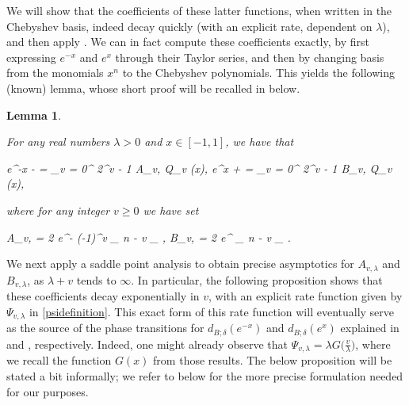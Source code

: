 \documentclass[10pt,a4paper]{article}
\theoremstyle{plain}\newtheorem{theorem}{Theorem}
\newtheorem{lemma}[theorem]{Lemma}
\theoremstyle{definition}
\begin{document}
	We will show that the coefficients of these latter functions, when written in the Chebyshev basis, indeed decay quickly (with an explicit rate, dependent on $\lambda$), and then apply . We can in fact compute these coefficients exactly, by first expressing $e^{-x}$ and $e^x$ through their Taylor series, and then by changing basis from the monomials $x^n$ to the Chebyshev polynomials. This yields the following (known) lemma, whose short proof will be recalled in  below.
    		
	
	\begin{lemma} 
		
	\label{amlambda}
	
	For any real numbers $\lambda > 0$ and $x \in [-1, 1]$, we have that 
	\begin{flalign}
	\label{absum} 
	e^{-\lambda x - \lambda} = \displaystyle\sum_{v = 0}^{\infty} 2^{v - 1} A_{v, \lambda} Q_v (x), \qquad e^{\lambda x + \lambda} = \displaystyle\sum_{v = 0}^{\infty} 2^{v - 1} B_{v, \lambda} Q_v (x),
	\end{flalign}
	
	\noindent where for any integer $v \ge 0$ we have set 
	\begin{flalign}
	\label{avlambdadefinition}
	A_{v, \lambda} = 2 e^{-\lambda} (-1)^v \displaystyle\sum_{ n - v  _{}} \displaystyle{} , \qquad B_{v, \lambda} = 2 e^{\lambda} \displaystyle\sum_{ n - v  _{}} \displaystyle{} \binom{n}{\frac{n - v}{2}}.
	\end{flalign}
	
		
	\end{lemma} 
	

    We next apply a saddle point analysis to obtain precise asymptotics for $A_{v, \lambda}$ and $B_{v, \lambda}$, as $\lambda + v$ tends to $\infty$. In particular, the following proposition shows that these coefficients decay exponentially in $v$, with an explicit rate function given by $\Psi_{v, \lambda}$ in \eqref{psidefinition}. This exact form of this rate function will eventually serve as the source of the phase transitions for $d_{B; \delta} (e^{-x})$ and $d_{B; \delta} (e^x)$ explained in  and , respectively. Indeed, one might already observe that $\Psi_{v, \lambda} = \lambda G \big( \frac{v}{\lambda} \big)$, where we recall the function $G(x)$ from those results. The below proposition will be stated a bit informally; we refer to  below for the more precise formulation needed for our purposes.
	
\end{document}
